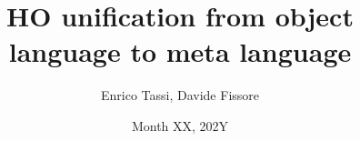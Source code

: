 \documentclass{rapport}
\author{Enrico Tassi, Davide Fissore}
\title{HO unification from object language to meta language}
\date{Month XX, 202Y}
\begin{document}
\maketitle

\def\elpi{\proglang{elpi}}
\def\coqelpi{\proglang{coq-elpi}}
\def\lambdaprolog{\proglang{$\lambda$-prolog}}
\def\coq{\proglang{coq}}

\newcommand{\library}[1]{\textit{#1}\xspace}
\def\stdpp{\library{stdpp}}
\def\iris{\library{iris}}

\newcommand*{\acronym}[1]{\texttt{#1}\xspace}

\def\ol{\acronym{ol}} %
\def\ml{\acronym{ml}} %
\def\lf{\acronym{lf}} %
\def\ho{\acronym{ho}} %
\def\Forall{$\forall$}

\newcommand*{\eqtau}{\ensuremath{\mathrel{\overset{\mathrm{\tau}}{=}}}}

\begin{comment}
\begin{abstract}


  Meta-programming \cite{hill1994} is a programming technique in which a
  program, referred to as meta language (\ml), can treat an other program, knwon
  as the object language (\ol) as its data. This programming approach is used in
  various works \cite{cite1, cite2...} to construct logical frameworks (\lf)
  capable of automating proof resolution. In many of the
  previously mentioned works, the equational theory expressed by the \ol is
  weaker than the \ml one. Consequently, no effort is required to adjust the
  unification algorithm of the \ml to represent the unification process of 
  the \ol: the former algorithm encompassing the second one. In our
  specific scenario, however, we work with an \ol with a richer equational
  theory than our \ml. This paper introduces a framework that enables the \ml to
  comprehend the unification of the \ol in the context of higher-order 
  unification. Practical applications of these findings will be provided.

\end{abstract}
\end{comment}
\end{document}
